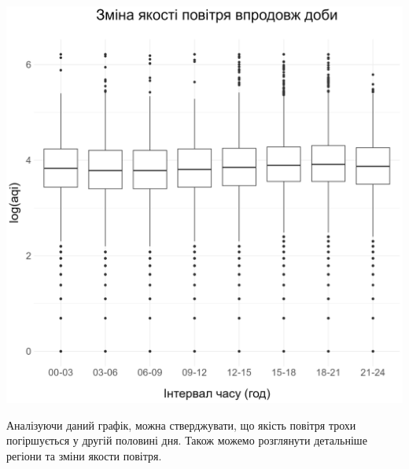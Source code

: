 \documentclass{article}
\begin{document}
\begin{enumerate}
    \begin{center}
    \includegraphics[width=6in]{plots/question3/box.png}
    \end{center}
    Аналізуючи даний графік, можна стверджувати, що якість повітря трохи погіршується у другій половині дня.
    Також можемо розглянути детальніше регіони та зміни якости повітря. 
    

\end{enumerate}
\end{document}
